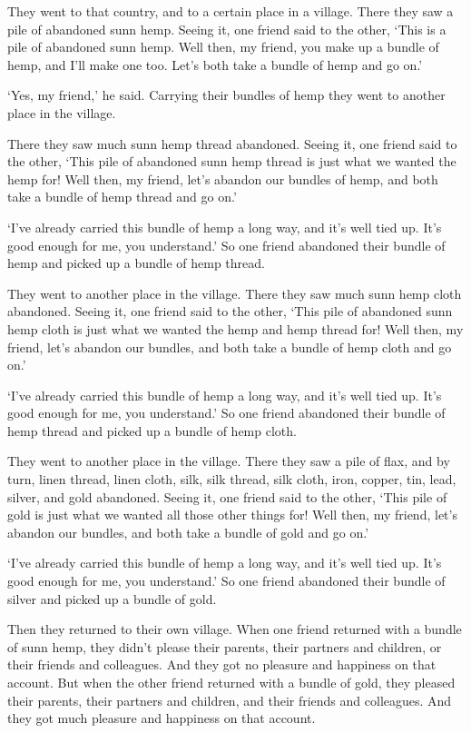 \documentclass[12pt,openany]{book}%
\begin{document}
They went to that country, and to a certain place in a village. There they saw a pile of abandoned sunn hemp. Seeing it, one friend said to the other, ‘This is a pile of abandoned sunn hemp. Well then, my friend, you make up a bundle of hemp, and I’ll make one too. Let’s both take a bundle of hemp and go on.’ 

‘Yes, my friend,’ he said. Carrying their bundles of hemp they went to another place in the village. 

There they saw much sunn hemp thread abandoned. Seeing it, one friend said to the other, ‘This pile of abandoned sunn hemp thread is just what we wanted the hemp for! Well then, my friend, let’s abandon our bundles of hemp, and both take a bundle of hemp thread and go on.’ 

‘I’ve already carried this bundle of hemp a long way, and it’s well tied up. It’s good enough for me, you understand.’ So one friend abandoned their bundle of hemp and picked up a bundle of hemp thread. 

They went to another place in the village. There they saw much sunn hemp cloth abandoned. Seeing it, one friend said to the other, ‘This pile of abandoned sunn hemp cloth is just what we wanted the hemp and hemp thread for! Well then, my friend, let’s abandon our bundles, and both take a bundle of hemp cloth and go on.’ 

‘I’ve already carried this bundle of hemp a long way, and it’s well tied up. It’s good enough for me, you understand.’ So one friend abandoned their bundle of hemp thread and picked up a bundle of hemp cloth. 

They went to another place in the village. There they saw a pile of flax, and by turn, linen thread, linen cloth, silk, silk thread, silk cloth, iron, copper, tin, lead, silver, and gold abandoned. Seeing it, one friend said to the other, ‘This pile of gold is just what we wanted all those other things for! Well then, my friend, let’s abandon our bundles, and both take a bundle of gold and go on.’ 

‘I’ve already carried this bundle of hemp a long way, and it’s well tied up. It’s good enough for me, you understand.’ So one friend abandoned their bundle of silver and picked up a bundle of gold. 

Then they returned to their own village. When one friend returned with a bundle of sunn hemp, they didn’t please their parents, their partners and children, or their friends and colleagues. And they got no pleasure and happiness on that account. But when the other friend returned with a bundle of gold, they pleased their parents, their partners and children, and their friends and colleagues. And they got much pleasure and happiness on that account. 
\end{document}
